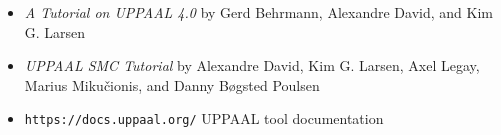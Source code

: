 \begin{itemize}
    \item \emph{A Tutorial on UPPAAL 4.0} by Gerd Behrmann, Alexandre David, and Kim G. Larsen 
    \item \emph{UPPAAL SMC Tutorial} by Alexandre David, Kim G. Larsen, Axel Legay, Marius Mikučionis, and Danny Bøgsted Poulsen
    \item \verb|https://docs.uppaal.org/| UPPAAL tool documentation 
\end{itemize}
